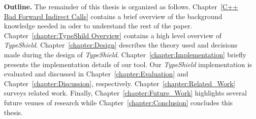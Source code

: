 \textbf{Outline.}
\label{Outline}
The remainder of this thesis is organized as follows.
Chapter~\ref{C++ Bad Forward Indirect Calls} contains a brief overview of the background knowledge needed in oder 
to understand the rest of the paper.
Chapter~\ref{chapter:TypeShild Overview} contains a high level overview of \textit{TypeShield}.
Chapter~\ref{chapter:Design} describes the theory used and decisions made during the design of \textit{TypeShield}.
Chapter~\ref{chapter:Implementation} briefly presents the implementation details of our tool.
Our \textit{TypeShield} implementation is evaluated and discussed in
Chapter~\ref{chapter:Evaluation} and Chapter~\ref{chapter:Discussion}, respectively.
Chapter~\ref{chapter:Related_Work} surveys related work.
Finally, Chapter~\ref{chapter:Future_Work} highlights several future venues of research while
Chapter~\ref{chapter:Conclusion} concludes this thesis.


